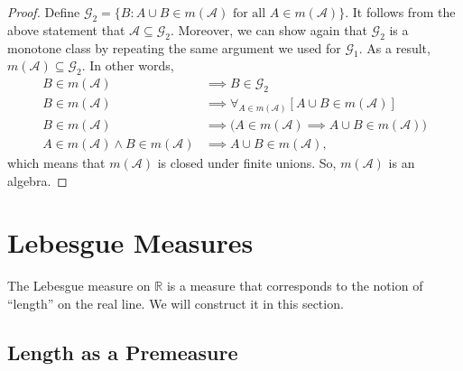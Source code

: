\documentclass[10pt]{article}
\newcommand{\mcal}[1]{\mathcal{#1}}
\newcommand{\Real}{\mathbb{R}}
\begin{document}
\begin{itemize}
\begin{proof}
    Define $\mcal{G}_2 = \{ B: A \cup B \in m(\mcal{A})\mbox{ for all }A \in m(\mcal{A})\}$. It follows from the above statement that $\mcal{A} \subseteq \mcal{G}_2$. Moreover, we can show again that $\mcal{G}_2$ is a monotone class by repeating the same argument we used for $\mcal{G}_1$. As a result, $m(\mcal{A}) \subseteq \mcal{G}_2$. In other words,
    \begin{align*}
      B \in m(\mcal{A}) &\implies B \in \mcal{G}_2 \\
      B \in m(\mcal{A}) &\implies \forall_{A \in m(\mcal{A})} [A \cup B \in m(\mcal{A})] \\
      B \in m(\mcal{A}) &\implies \Big( A \in m(\mcal{A}) \implies A \cup B \in m(\mcal{A}) \Big) \\
      A \in m(\mcal{A}) \wedge B \in m(\mcal{A}) &\implies A \cup B \in m(\mcal{A}),
    \end{align*}
    which means that $m(\mcal{A})$ is closed under finite unions. So, $m(\mcal{A})$ is an algebra.
  \end{proof}
\end{itemize}

\section{Lebesgue Measures}

The Lebesgue measure on $\Real$ is a measure that corresponds to the notion of ``length'' on the real line. We will construct it in this section.

\subsection{Length as a Premeasure}
\end{document}
